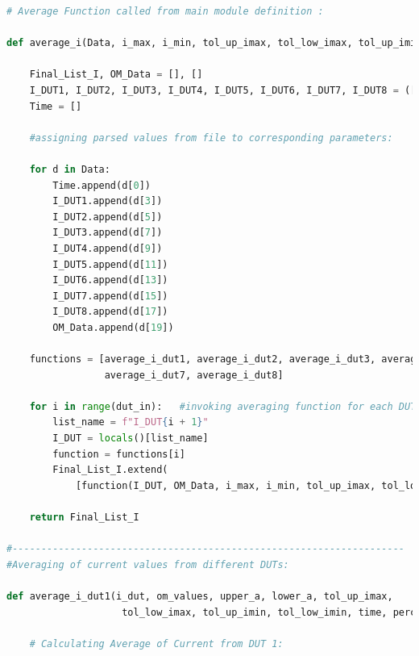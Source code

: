 \begin{lstlisting}[language = Python]
# Average Function called from main module definition :
 
def average_i(Data, i_max, i_min, tol_up_imax, tol_low_imax, tol_up_imin, tol_low_imin, dut_in, perc):
 
    Final_List_I, OM_Data = [], []
    I_DUT1, I_DUT2, I_DUT3, I_DUT4, I_DUT5, I_DUT6, I_DUT7, I_DUT8 = ([] for i in range(8))
    Time = []
    
    #assigning parsed values from file to corresponding parameters:
    
    for d in Data:
        Time.append(d[0])
        I_DUT1.append(d[3])
        I_DUT2.append(d[5])
        I_DUT3.append(d[7])
        I_DUT4.append(d[9])
        I_DUT5.append(d[11])
        I_DUT6.append(d[13])
        I_DUT7.append(d[15])
        I_DUT8.append(d[17])
        OM_Data.append(d[19])
 
    functions = [average_i_dut1, average_i_dut2, average_i_dut3, average_i_dut4, average_i_dut5, average_i_dut6,
                 average_i_dut7, average_i_dut8]
                 
    for i in range(dut_in):   #invoking averaging function for each DUTs
        list_name = f"I_DUT{i + 1}"
        I_DUT = locals()[list_name]
        function = functions[i]
        Final_List_I.extend(
            [function(I_DUT, OM_Data, i_max, i_min, tol_up_imax, tol_low_imax, tol_up_imin, tol_low_imin, Time, perc)])
 
    return Final_List_I

#--------------------------------------------------------------------
#Averaging of current values from different DUTs:
 
def average_i_dut1(i_dut, om_values, upper_a, lower_a, tol_up_imax, 
                    tol_low_imax, tol_up_imin, tol_low_imin, time, perc):
 
    # Calculating Average of Current from DUT 1:
 

\end{lstlisting}
